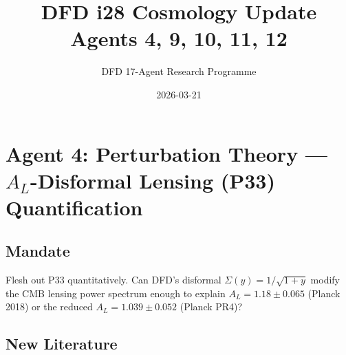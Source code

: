 \documentclass[11pt,a4paper]{article}
\title{DFD i28 Cosmology Update\\Agents 4, 9, 10, 11, 12}
\author{DFD 17-Agent Research Programme}
\date{2026-03-21}
\begin{document}
\maketitle
\tableofcontents
\newpage

\section{Agent 4: Perturbation Theory --- $A_L$-Disformal Lensing (P33) Quantification}

\subsection{Mandate}
Flesh out P33 quantitatively. Can DFD's disformal $\Sigma(y) = 1/\sqrt{1+y}$ modify the CMB lensing power spectrum enough to explain $A_L = 1.18 \pm 0.065$ (Planck 2018) or the reduced $A_L = 1.039 \pm 0.052$ (Planck PR4)?

\subsection{New Literature}
\end{document}
